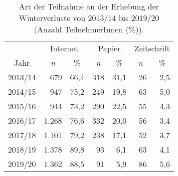 \begin{table}[H]
    \centering
    \caption{Art der Teilnahme an der Erhebung der Winterverluste von 2013/14 bis 2019/20 (Anzahl TeilnehmerInnen (\%)).}
    \label{tab:u:teilnameart}
    \begin{tabular}{c|*{2}{rr|}rr}
        \toprule
            \multicolumn{1}{c}{}& 
            \multicolumn{2}{c}{Internet} & 
            \multicolumn{2}{c}{Papier} & 
            \multicolumn{2}{c}{Zeitschrift} \\
        \cmidrule{2-7}
            \multicolumn{1}{c}{Jahr} & 
            \multicolumn{1}{c}{\textit{n}} & 
            \multicolumn{1}{c}{\%} & 
            \multicolumn{1}{c}{\textit{n}} & 
            \multicolumn{1}{c}{\%} & 
            \multicolumn{1}{c}{\textit{n}} & 
            \multicolumn{1}{c}{\%} \\
        \midrule
        2013/14 &   679 & 66,4 & 318 & 31,1 & 26 & 2,5 \\
        2014/15 &   947 & 75,2 & 249 & 19,8 & 63 & 5,0 \\
        2015/16 &   944 & 73,2 & 290 & 22,5 & 55 & 4,3 \\
        2016/17 & 1.268 & 76,6 & 332 & 20,0 & 56 & 3,4 \\
        2017/18 & 1.101 & 79,2 & 238 & 17,1 & 52 & 3,7 \\
        2018/19 & 1.378 & 89,8 &  93 &  6,1 & 63 & 4,1 \\
        2019/20 & 1.362 & 88,5 &  91 &  5,9 & 86 & 5,6 \\
        \bottomrule
    \end{tabular}
\end{table}